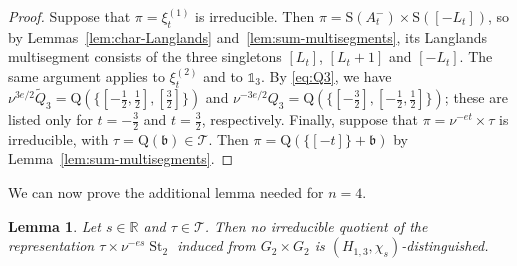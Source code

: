 \documentclass[11pt]{amsart}
\numberwithin{equation}{section}
\theoremstyle{plain}
\newtheorem{lemma}[theorem]{Lemma}
\theoremstyle{definition}
\theoremstyle{remark}
\newcommand{\R}{\mathbb{R}}
\newcommand{\one}{\mathds{1}}
\newcommand{\T}{\mathcal{T}}
\DeclareMathOperator{\St}{St}
\newcommand{\Qt}{\widetilde{Q}}
\newcommand{\xione}{\xi^{(1)}}
\newcommand{\xitwo}{\xi^{(2)}}
\newcommand{\bb}{\mathfrak{b}}
\newcommand{\Ss}{\mathrm{S}}
\newcommand{\Qq}{\mathrm{Q}}
\begin{document}
\begin{proof}
	Suppose that $\pi=\xione_t$ is irreducible. Then $\pi=\Ss(A_t^-)\times\Ss([-L_t])$, so by Lemmas~\ref{lem:char-Langlands} and~\ref{lem:sum-multisegments}, its Langlands multisegment consists of the three singletons $[L_t]$, $[L_t+1]$ and $[-L_t]$. The same argument applies to $\xitwo_t$ and to $\one_3$. By \eqref{eq:Q3}, we have $\nu^{3e/2}\Qt_3=\Qq(\{[-\frac12,\frac12],[\frac32]\})$ and $\nu^{-3e/2}Q_3=\Qq(\{[-\frac32],[-\frac12,\frac12]\})$; these are listed only for $t=-\frac32$ and $t=\frac32$, respectively. Finally, suppose that $\pi=\nu^{-et}\times\tau$ is irreducible, with $\tau=\Qq(\bb)\in\T$. Then $\pi=\Qq(\{[-t]\}+\bb)$ by Lemma~\ref{lem:sum-multisegments}.
\end{proof}

We can now prove the additional lemma needed for $n=4$.

\begin{lemma}\label{lem:n4-special}
	Let $s\in\R$ and $\tau\in\T$. Then no irreducible quotient of the representation $\tau\times\nu^{-es}\St_2$ induced from $G_2\times G_2$ is $(H_{1,3},\chi_s)$-distinguished.
\end{lemma}
\end{document}
